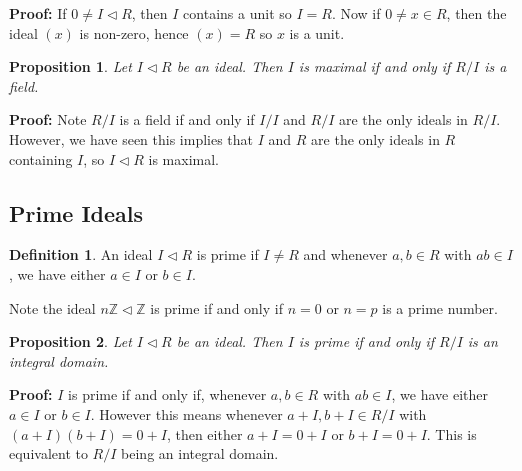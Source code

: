 \documentclass[12pt]{article}
\newtheorem{proposition}{Proposition}[section]
\theoremstyle{definition}
\newtheorem{definition}{Definition}[section]
\theoremstyle{remark}
\begin{document}
\begin{adjustbox}{minipage = \columnwidth - 25.5pt, margin=1em, frame=1pt, margin=0em}
	\textbf{Proof:} If $0 \neq I \lhd R$, then $I$ contains a unit so $I = R$. Now if $0 \neq x \in R$, then the ideal $(x)$ is non-zero, hence $(x) = R$ so $x$ is a unit.
\end{adjustbox}

\begin{proposition}
	Let $I \lhd R$ be an ideal. Then $I$ is maximal if and only if $R/I$ is a field.
\end{proposition}

\begin{adjustbox}{minipage = \columnwidth - 25.5pt, margin=1em, frame=1pt, margin=0em}
	\textbf{Proof:} Note $R/I$ is a field if and only if $I/I$ and $R/I$ are the only ideals in $R/I$. However, we have seen this implies that $I$ and $R$ are the only ideals in $R$ containing $I$, so $I \lhd R$ is maximal.
\end{adjustbox}

\subsection{Prime Ideals}%
\label{sub:prime_ideals}

\begin{definition}
	An ideal $I \lhd R$ is prime if $I \neq R$ and whenever $a, b \in R$ with $ab \in I$, we have either $a \in I$ or $b \in I$.
\end{definition}

Note the ideal $n \mathbb{Z} \lhd \mathbb{Z}$ is prime if and only if $n = 0$ or $n = p$ is a prime number.

\begin{proposition}
	Let $I \lhd R$ be an ideal. Then $I$ is prime if and only if $R/I$ is an integral domain.
\end{proposition}

\begin{adjustbox}{minipage = \columnwidth - 25.5pt, margin=1em, frame=1pt, margin=0em}
	\textbf{Proof:} $I$ is prime if and only if, whenever $a, b \in R$ with $ab \in I$, we have either $a \in I$ or $b \in I$. However this means whenever $a + I, b + I \in R/I$ with $(a + I)(b + I) = 0 + I$, then either $a + I = 0 + I$ or $b + I = 0 + I$. This is equivalent to $R/I$ being an integral domain.
\end{adjustbox}
\end{document}
